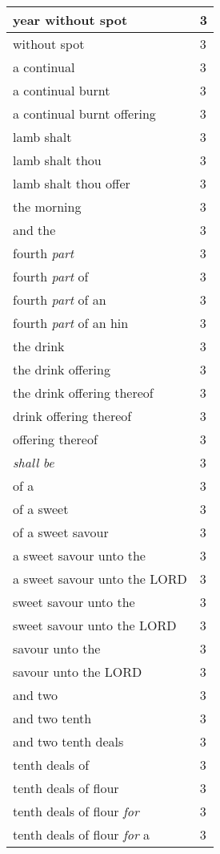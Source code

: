 \begin{center}
\begin{longtable}{|p{3.0in}|p{0.5in}|}
year without spot & 3\\ \hline 
without spot & 3\\ \hline 
a continual & 3\\ \hline 
a continual burnt & 3\\ \hline 
a continual burnt offering & 3\\ \hline 
lamb shalt & 3\\ \hline 
lamb shalt thou & 3\\ \hline 
lamb shalt thou offer & 3\\ \hline 
the morning & 3\\ \hline 
and the & 3\\ \hline 
fourth \emph{part} & 3\\ \hline 
fourth \emph{part} of & 3\\ \hline 
fourth \emph{part} of an & 3\\ \hline 
fourth \emph{part} of an hin & 3\\ \hline 
the drink & 3\\ \hline 
the drink offering & 3\\ \hline 
the drink offering thereof & 3\\ \hline 
drink offering thereof & 3\\ \hline 
offering thereof & 3\\ \hline 
\emph{shall} \emph{be} & 3\\ \hline 
of a & 3\\ \hline 
of a sweet & 3\\ \hline 
of a sweet savour & 3\\ \hline 
a sweet savour unto the & 3\\ \hline 
a sweet savour unto the LORD & 3\\ \hline 
sweet savour unto the & 3\\ \hline 
sweet savour unto the LORD & 3\\ \hline 
savour unto the & 3\\ \hline 
savour unto the LORD & 3\\ \hline 
and two & 3\\ \hline 
and two tenth & 3\\ \hline 
and two tenth deals & 3\\ \hline 
tenth deals of & 3\\ \hline 
tenth deals of flour & 3\\ \hline 
tenth deals of flour \emph{for} & 3\\ \hline 
tenth deals of flour \emph{for} a & 3\\ \hline 

\end{longtable}
\end{center}
